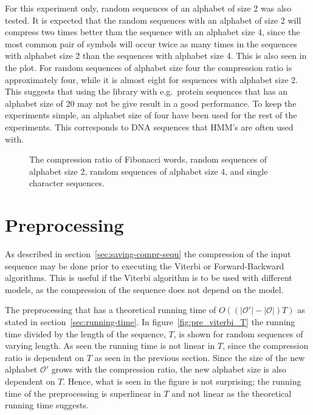 For this experiment only, random sequences of an alphabet of size 2 was also
tested. It is expected that the random sequences with an alphabet of size 2
will compress two times better than the sequence with an alphabet size 4, since
the most common pair of symbols will occur twice as many times in the sequences
with alphabet size 2 than the sequences with alphabet size 4. This is also seen
in the plot. For random sequences of alphabet size four the compression ratio
is approximately four, while it is almost eight for sequences with alphabet
size 2. This suggests that using the library with e.g.\ protein sequences that
has an alphabet size of 20 may not be give result in a good performance. To
keep the experiments simple, an alphabet size of four have been used for the
rest of the experiments. This corresponds to DNA sequences that HMM's are often
used with.

\begin{figure}
  \centering
  
  \caption{The compression ratio of Fibonacci words, random sequences of
    alphabet size 2, random sequences of alphabet size 4, and single character
    sequences.}
  \label{fig:compression_ratio}
\end{figure}

\section{Preprocessing}

As described in section~\ref{sec:saving-compr-sequ} the compression of the
input sequence may be done prior to executing the Viterbi or Forward-Backward
algorithms. This is useful if the Viterbi algorithm is to be used with different
models, as the compression of the sequence does not depend on the model.

The preprocessing that has a theoretical running time of
$O( \left( \lvert\mathcal{O'}\rvert - \lvert{\mathcal{O}}\rvert \right) T)$ as
stated in section~\ref{sec:running-time}. In figure~\ref{fig:pre_viterbi_T} the
running time divided by the length of the sequence, $T$, is shown for random
sequences of varying length. As seen the running time is not linear in $T$,
since the compression ratio is dependent on $T$ as seen in the previous
section. Since the size of the new alphabet $\mathcal{O'}$ grows with the
compression ratio, the new alphabet size is also dependent on $T$. Hence, what
is seen in the figure is not surprising; the running time of the preprocessing
is superlinear in $T$ and not linear as the theoretical running time suggests.

